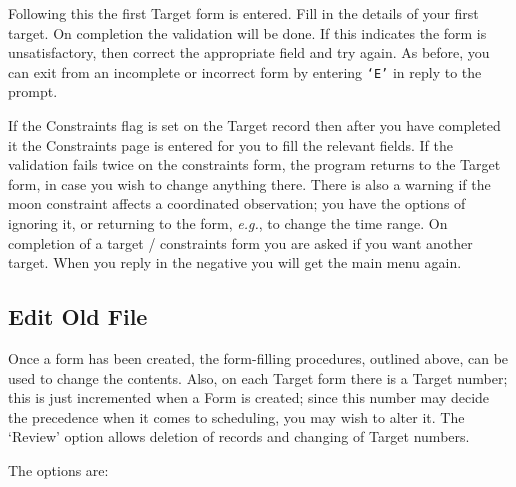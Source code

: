 Following this the first Target form is entered. Fill in the details of
your first target.  On completion the validation will be done.  If this
indicates the form is unsatisfactory, then correct the appropriate
field and try again. As before, you can exit from an incomplete or
incorrect form by entering {\tt `E'} in reply to the prompt.

If the Constraints flag is set on the Target record then after you have
completed it the Constraints page is entered for you to fill the
relevant fields.  If the validation fails twice on the constraints
form, the program returns to the Target form, in case you wish to
change anything there. There is also a warning if the moon constraint
affects a coordinated observation; you have the options of ignoring it,
or returning to the form, {\em e.g.}, to change the time range.  On
completion of a target / constraints form you are asked if you want
another target. When you reply in the negative you will get the main
menu again.

\subsection{Edit Old File}

Once a form has been created, the form-filling procedures, outlined
above, can be used to change the contents. Also, on each Target form
there is a Target number; this is just incremented when a Form is
created; since this number may decide the precedence when it comes to
scheduling, you may wish to alter it.  The `Review' option allows
deletion of records and changing of Target numbers.

The options are:

